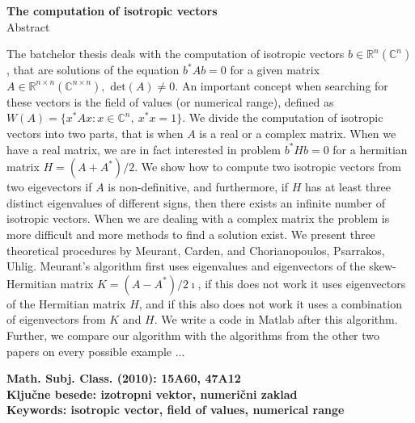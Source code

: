 \documentclass[12pt,a4paper]{amsart}
\theoremstyle{definition}
\theoremstyle{plain}
\newcommand{\R}{\mathbb R}
\newcommand{\C}{\mathbb C}
\begin{document}
\vfill
\begin{center}
{\bf The computation of isotropic vectors}\\[3mm]
{\sc Abstract}
\end{center}
The batchelor thesis deals with the computation of isotropic vectors $b\in\R^{n} (\C^{n})$, that are solutions of the equation $b^\ast Ab=0$ for a given matrix $A\in\R^{n\times n} (\C^{n\times n}),$ $\text{det}(A)\ne 0$.
An important concept when searching for these vectors is the field of values (or numerical range), defined as $W(A)=\{x^\ast Ax\! : x \in \C^n,\ x^\ast x=1\}.$ %
We divide the computation of isotropic vectors into two parts, that is when $A$ is a real or a complex matrix.
When we have a real matrix, we are in fact interested in problem $b^\ast Hb=0$ for a hermitian matrix $H=(A+A^\ast)/2$.
We show how to compute two isotropic vectors from two eigevectors if $A$ is non-definitive, and furthermore, if $H$ has at least three distinct eigenvalues of different signs, then there exists an infinite number of isotropic vectors.
When we are dealing with a complex matrix the problem is more difficult and more methods to find a solution exist. We present three theoretical procedures by Meurant, Carden, and Chorianopoulos, Psarrakos, Uhlig.
Meurant's algorithm first uses eigenvalues and eigenvectors of the skew-Hermitian matrix $K=(A-A^\ast)/2\imath$, if this does not work it uses eigenvectors of the Hermitian matrix $H$, and if this also does not work it uses a combination of eigenvectors from $K$ and $H$.
We write a code in Matlab after this algorithm.
Further, we compare our algorithm with the algorithms from the other two papers on every possible example $\dots$


\vfill\noindent
{\bf Math. Subj. Class. (2010): 15A60, 47A12}   \\[1mm]
{\bf Ključne besede: izotropni vektor, numerični zaklad}   \\[1mm]
{\bf Keywords: isotropic vector, field of values, numerical range}
\pagebreak
\end{document}
